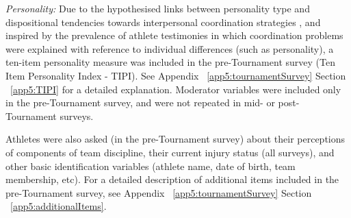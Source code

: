 \textit{Personality:} Due to the hypothesised links between personality type and dispositional tendencies towards interpersonal coordination strategies \citep[see for example][]{Marsh2009}, and inspired by the prevalence of athlete testimonies in which coordination problems were explained with reference to individual differences (such as personality),  a ten-item personality measure was included in the pre-Tournament survey (Ten Item Personality Index - TIPI)\citep{Gosling2003}. See Appendix ~\ref{app5:tournamentSurvey} Section ~\ref{app5:TIPI} for a detailed explanation.  Moderator variables were included only in the pre-Tournament survey, and were not repeated in mid- or post-Tournament surveys.

Athletes were also asked (in the pre-Tournament survey) about their perceptions of components of team discipline, their current injury status (all surveys), and other basic identification variables (athlete name, date of birth, team membership, etc).  For a detailed description of additional items included in the pre-Tournament survey, see Appendix ~\ref{app5:tournamentSurvey} Section ~\ref{app5:additionalItems}.



